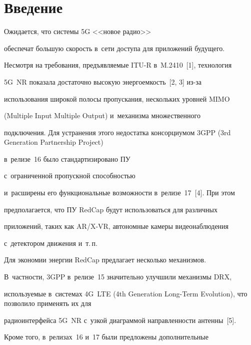   


\section{Введение}





\vspace*{-4pt}








     Ожидается, что системы 5G <<новое радио>>  


обеспечат большую скорость в~сети доступа для приложений будущего. 


Несмотря на требования, предъявляемые ITU-R в~M.2410~[1], технология 


5G~NR показала достаточно высокую энергоемкость~[2, 3] из-за 


использования широкой полосы пропускания, нескольких уровней MIMO 


(Multiple Input Multiple Output) и~механизма множественного 


подключения. Для устранения этого недостатка консорциумом 3GPP (3rd Generation Partnership Project)


в~релизе~16 было стандартизировано ПУ 


с~ограниченной пропускной способностью 


и~расширены его функциональные возможности в~релизе~17~[4]. При этом 


предполагается, что ПУ RedCap будут использоваться для различных 


приложений, таких как AR/X-VR, автономные камеры видеонаблюдения 


с~детектором движения и~т.\,п.





     


     Для экономии энергии RedCap предлагает несколько механизмов. 


В~част\-ности, 3GPP в~релизе~15 значительно улучшили механизмы DRX, 


используемые в~системах 4G~LTE (4th Generation Long-Term Evolution), что позволило применять их для 


радиоинтерфейса 5G~NR с~узкой диаграммой направленности антенны~[5]. 


Кроме того, в~релизах~16 и~17 были предложены дополнительные 


